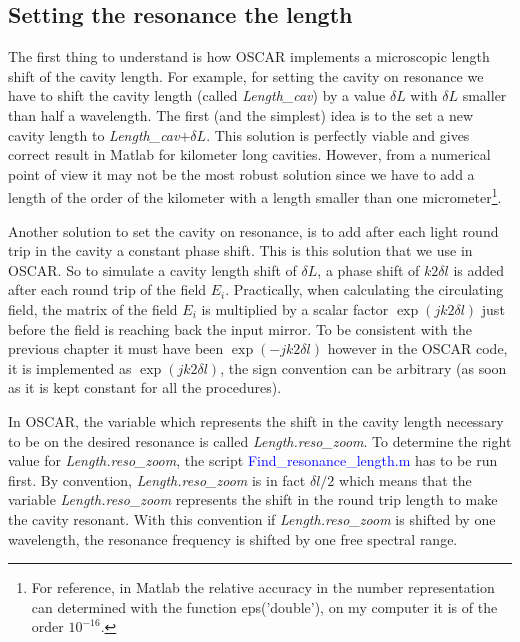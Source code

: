 \subsection{Setting the resonance the length}

The first thing to understand is how OSCAR implements a microscopic length shift of the cavity length. For example, for setting the cavity on resonance we have to shift the cavity length (called \textsl{Length\_cav}) by a value $\delta L$ with $\delta L$ smaller than half a wavelength. The first (and the simplest) idea is to the set a new cavity length to \textsl{Length\_cav}$ + \delta L$. This solution is perfectly viable and gives correct result in Matlab for kilometer long cavities. However, from a numerical point of view it may not be the most robust solution since we have to add a length of the order of the kilometer with a length smaller than one micrometer\footnote{For reference, in Matlab the relative accuracy in the number representation can determined with the function eps('double'), on my computer it is of the order $10^{-16}$.}.

Another solution to set the cavity on resonance, is to add after each light round trip in the cavity a constant phase shift. This is this solution that we use in OSCAR. So to simulate a cavity length shift of $\delta L$, a phase shift of $ k 2 \delta l$ is added after each round trip of the field $E_i$. Practically, when calculating the circulating field, the matrix of the field $E_i$ is multiplied by a scalar factor $\exp{(j k 2 \delta l)}$ just before the field is reaching back the input mirror. To be consistent with the previous chapter it must have been $\exp{(-j k 2 \delta l)}$ however in the OSCAR code, it is implemented as $\exp{(j k 2 \delta l)}$, the sign convention can be arbitrary (as soon as it is kept constant for all the procedures).

In OSCAR, the variable which represents the shift in the cavity length necessary to be on the desired resonance is called \textsl{Length.reso\_zoom}. To determine the right value for \textsl{Length.reso\_zoom}, the script \textcolor{blue}{Find\_resonance\_length.m} has to be run first. By convention, \textsl{Length.reso\_zoom} is in fact $\delta l/2$ which means that the variable \textsl{Length.reso\_zoom} represents the shift in the round trip length to make the cavity resonant. With this convention if \textsl{Length.reso\_zoom} is shifted by one wavelength, the resonance frequency is shifted by one free spectral range.\\


